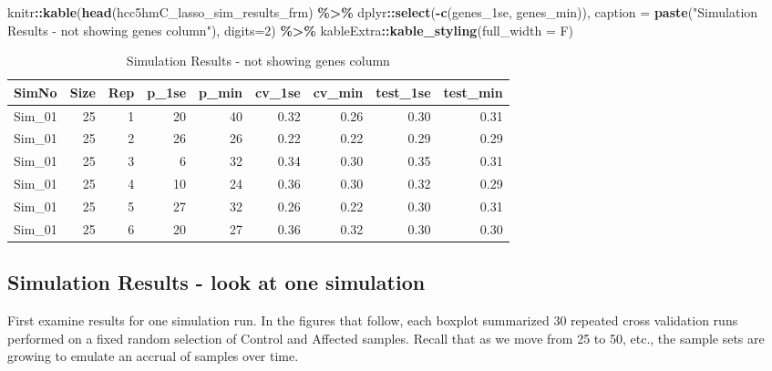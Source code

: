 \documentclass[
]{book}
\newenvironment{Shaded}{\begin{snugshade}}{\end{snugshade}}
\newcommand{\DataTypeTok}[1]{\textcolor[rgb]{0.13,0.29,0.53}{#1}}
\newcommand{\DecValTok}[1]{\textcolor[rgb]{0.00,0.00,0.81}{#1}}
\newcommand{\KeywordTok}[1]{\textcolor[rgb]{0.13,0.29,0.53}{\textbf{#1}}}
\newcommand{\NormalTok}[1]{#1}
\newcommand{\OperatorTok}[1]{\textcolor[rgb]{0.81,0.36,0.00}{\textbf{#1}}}
\newcommand{\StringTok}[1]{\textcolor[rgb]{0.31,0.60,0.02}{#1}}
\begin{document}
\begin{Shaded}
\begin{Highlighting}[]
\NormalTok{knitr}\OperatorTok{::}\KeywordTok{kable}\NormalTok{(}\KeywordTok{head}\NormalTok{(hcc5hmC\_lasso\_sim\_results\_frm) }\OperatorTok{\%>\%}\StringTok{ }\NormalTok{dplyr}\OperatorTok{::}\KeywordTok{select}\NormalTok{(}\OperatorTok{{-}}\KeywordTok{c}\NormalTok{(genes\_1se, genes\_min)),}
    \DataTypeTok{caption =} \KeywordTok{paste}\NormalTok{(}\StringTok{"Simulation Results {-} not showing genes column"}\NormalTok{),}
    \DataTypeTok{digits=}\DecValTok{2}\NormalTok{) }\OperatorTok{\%>\%}
\StringTok{   }\NormalTok{kableExtra}\OperatorTok{::}\KeywordTok{kable\_styling}\NormalTok{(}\DataTypeTok{full\_width =}\NormalTok{ F)}
\end{Highlighting}
\end{Shaded}

\begin{table}

\caption{\label{tab:hcc5hmC-glmnetSuite-sum-table}Simulation Results - not showing genes column}
\centering
\begin{tabular}[t]{l|r|r|r|r|r|r|r|r}
\hline
SimNo & Size & Rep & p\_1se & p\_min & cv\_1se & cv\_min & test\_1se & test\_min\\
\hline
Sim\_01 & 25 & 1 & 20 & 40 & 0.32 & 0.26 & 0.30 & 0.31\\
\hline
Sim\_01 & 25 & 2 & 26 & 26 & 0.22 & 0.22 & 0.29 & 0.29\\
\hline
Sim\_01 & 25 & 3 & 6 & 32 & 0.34 & 0.30 & 0.35 & 0.31\\
\hline
Sim\_01 & 25 & 4 & 10 & 24 & 0.36 & 0.30 & 0.32 & 0.29\\
\hline
Sim\_01 & 25 & 5 & 27 & 32 & 0.26 & 0.22 & 0.30 & 0.31\\
\hline
Sim\_01 & 25 & 6 & 20 & 27 & 0.36 & 0.32 & 0.30 & 0.30\\
\hline
\end{tabular}
\end{table}

\hypertarget{simulation-results---look-at-one-simulation}{%
\subsection{Simulation Results - look at one simulation}\label{simulation-results---look-at-one-simulation}}

First examine results for one simulation run. In the figures that follow,
each boxplot summarized 30 repeated cross validation runs performed on a
fixed random selection of Control and Affected samples. Recall that as
we move from 25 to 50, etc., the sample sets are growing to emulate an
accrual of samples over time.
\end{document}
